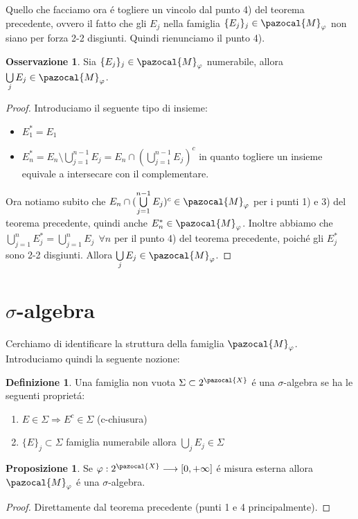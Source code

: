 \documentclass[11pt,a4paper]{report}
\theoremstyle{plain}
\theoremstyle{definition}
\newtheorem{defn}[thm]{Definizione} %
\newtheorem{prop}[thm]{Proposizione} %
\newtheorem{oss}[thm]{Osservazione} %
\newcommand{\M}{\pazocal{M}_\varphi}
\newcommand{\X}{\pazocal{X}}
\begin{document}
Quello che facciamo ora \'e togliere un vincolo dal punto 4) del teorema precedente, ovvero il fatto che gli $E_j$ nella famiglia $\{E_j\}_j \in \M$ non siano per forza 2-2 disgiunti. Quindi rienunciamo il punto 4).

\begin{oss}
	Sia $\{E_j\}_j \in \M$ numerabile, allora $\bigcup\limits_jE_j \in \M$.
\begin{proof}
Introduciamo il seguente tipo di insieme:
\begin{itemize}
	\item $E_1^* = E_1$
	\item $E_n^* = E_n \setminus \bigcup\limits_{j=1}^{n-1}E_j = E_n \cap (\bigcup\limits_{j=1}^{n-1}E_j)^c$ in quanto togliere un insieme equivale a intersecare con il complementare.
\end{itemize}
Ora notiamo subito che $E_n \cap (\bigcup\limits_{j=1}^{n-1}E_j)^c \in \M$ per i punti 1) e 3) del teorema precedente, quindi anche $E_n^* \in \M$. Inoltre abbiamo che $\bigcup\limits_{j=1}^{n}E_j^* = \bigcup\limits_{j=1}^{n}E_j\ \  \forall n$ per il punto 4) del teorema precedente, poich\'e gli $E_j^*$ sono 2-2 disgiunti. Allora $\bigcup\limits_jE_j \in \M$.
\end{proof}
\end{oss}

\section{$\sigma$-algebra}
Cerchiamo di identificare la struttura della famiglia $\M$. Introduciamo quindi la seguente nozione:
\begin{defn}
	Una famiglia non vuota $\Sigma \subset 2^\X$ \'e una $\sigma$-algebra se ha le seguenti propriet\'a:
	\begin{enumerate}
		\item $E \in \Sigma \Rightarrow E^c \in \Sigma$ (c-chiusura)
		\item $\{E\}_j \subset \Sigma$ famiglia numerabile allora $\bigcup\limits_jE_j \in \Sigma$
	\end{enumerate}
\end{defn}

\begin{prop}
	Se $\varphi : 2^\X \longrightarrow [0,+\infty]$ \'e misura esterna allora $\M$ \'e una $\sigma$-algebra.
\begin{proof}
	Direttamente dal teorema precedente (punti 1 e 4 principalmente).
\end{proof}
\end{prop}
\end{document}
